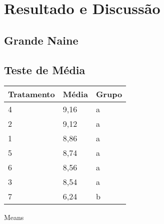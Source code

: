 \chapter{Resultado e Discussão}
\section{Grande Naine}

\section{Teste de Média}
  
 
 \begin{table}[htb]
 	\center
 	\footnotesize
 	\begin{tabular}{|p{1.4cm}|p{1cm}|p{3cm}}
 		\hline
 		\textbf{Tratamento} & \textbf{Média}  & \textbf{Grupo}\\
 		\hline
 		4 & 9,16 & a \\
 		\hline
 		2 & 9,12 & a \\
		\hline
 		1 & 8,86 & a \\
		\hline
 		5 & 8,74 & a \\
		\hline
 		6 & 8,56  & a \\
		\hline
 		3 & 8,54  & a \\
		\hline
 		7 & 6,24   & b \\
		\hline
		
 	\end{tabular}
 \end{table}
  
  Means